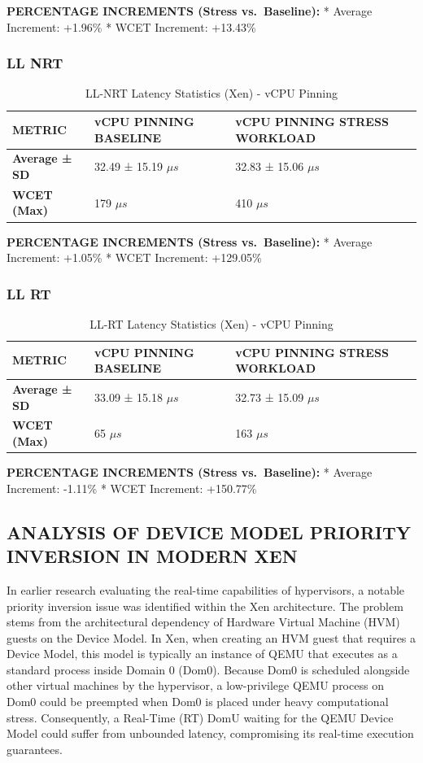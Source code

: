 \textbf{PERCENTAGE INCREMENTS (Stress vs.~Baseline):} * Average
Increment: +1.96\% * WCET Increment: +13.43\%

\subsubsection{LL NRT}\label{ll-nrt-1}

\begin{table}
\centering
\caption{LL-NRT Latency Statistics (Xen) - vCPU Pinning}
\begin{tabularx}{\linewidth}{@{}YYY@{}}
\toprule
METRIC & vCPU PINNING BASELINE & vCPU PINNING STRESS WORKLOAD\tabularnewline
\midrule
\textbf{Average ± SD} & 32.49 ± 15.19 $\mu s$ & 32.83 ± 15.06 $\mu s$\tabularnewline
\textbf{WCET (Max)} & 179 $\mu s$ & 410 $\mu s$\tabularnewline
\bottomrule
\end{tabularx}
\end{table}

\textbf{PERCENTAGE INCREMENTS (Stress vs.~Baseline):} * Average
Increment: +1.05\% * WCET Increment: +129.05\%

\subsubsection{LL RT}\label{ll-rt-1}

\begin{table}
\centering
\caption{LL-RT Latency Statistics (Xen) - vCPU Pinning}
\begin{tabularx}{\linewidth}{@{}YYY@{}}
\toprule
METRIC & vCPU PINNING BASELINE & vCPU PINNING STRESS WORKLOAD\tabularnewline
\midrule
\textbf{Average ± SD} & 33.09 ± 15.18 $\mu s$ & 32.73 ± 15.09 $\mu s$\tabularnewline
\textbf{WCET (Max)} & 65 $\mu s$ & 163 $\mu s$\tabularnewline
\bottomrule
\end{tabularx}
\end{table}

\textbf{PERCENTAGE INCREMENTS (Stress vs.~Baseline):} * Average
Increment: -1.11\% * WCET Increment: +150.77\%

\subsection{ANALYSIS OF DEVICE MODEL PRIORITY INVERSION IN MODERN
XEN}\label{analysis-of-device-model-priority-inversion-in-modern-xen}

In earlier research evaluating the real-time capabilities of
hypervisors, a notable priority inversion issue was identified within
the Xen architecture. The problem stems from the architectural
dependency of Hardware Virtual Machine (HVM) guests on the Device Model.
In Xen, when creating an HVM guest that requires a Device Model, this
model is typically an instance of QEMU that executes as a standard
process inside Domain 0 (Dom0). Because Dom0 is scheduled alongside
other virtual machines by the hypervisor, a low-privilege QEMU process
on Dom0 could be preempted when Dom0 is placed under heavy computational
stress. Consequently, a Real-Time (RT) DomU waiting for the QEMU Device
Model could suffer from unbounded latency, compromising its real-time
execution guarantees.

